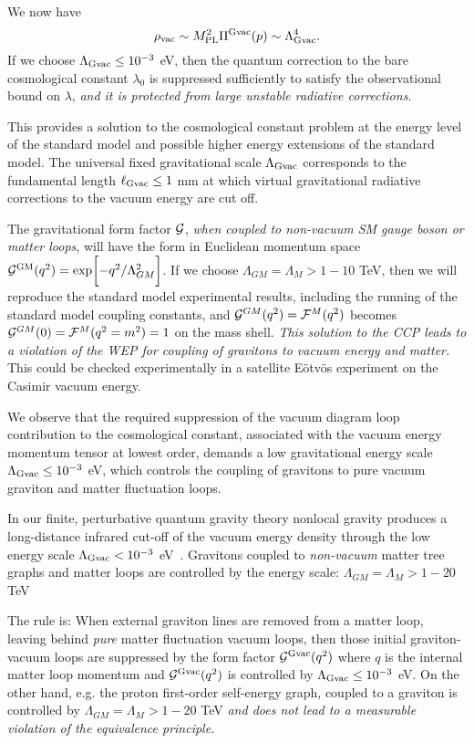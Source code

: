 \documentclass[a4paper,11pt]{article}
\begin{document}
We now have
\begin{equation}
\rho_{\rm vac}\sim M^2_{\rm PL}\Pi^{\rm {\rm Gvac}}(p)\sim\Lambda_{{\rm
Gvac}}^4.
\end{equation} If we choose $\Lambda_{{\rm Gvac}}\leq 10^{-3}$
eV, then the quantum correction to the bare cosmological constant
$\lambda_0$ is suppressed sufficiently to satisfy the observational bound
on $\lambda$, {\it and it is protected from large unstable radiative
corrections}.

This provides a solution to the
cosmological constant problem at the energy level of the standard model
and possible higher energy extensions of the standard model. The universal
fixed gravitational scale $\Lambda_{{\rm Gvac}}$ corresponds to the fundamental
length $\ell_{{\rm Gvac}}\leq 1$ mm at which virtual gravitational radiative
corrections to the vacuum energy are cut off.

The gravitational form factor ${\cal G}$, {\it when
coupled to non-vacuum SM gauge boson or matter loops}, will have the form
in Euclidean momentum space
${\cal G}^{\rm GM}(q^2)
=\exp\biggl[-q^2/\Lambda_{GM}^2\biggr]$.
If we choose $\Lambda_{GM} = \Lambda_{M}> 1-10$ TeV, then we will
reproduce the standard model experimental results, including the running
of the standard model coupling constants, and ${\cal G}^{GM}(q^2)={\cal
F}^M(q^2)$ becomes ${\cal G}^{GM}(0)={\cal F}^M(q^2=m^2)=1$ on the mass
shell. {\it This solution to the CCP leads to a violation of the WEP for
coupling of gravitons to vacuum energy and matter.} This
could be checked experimentally in a satellite E\"otv\"os experiment on the
Casimir vacuum energy.

We observe that the required suppression of the vacuum diagram
loop contribution to the cosmological constant, associated with
the vacuum energy momentum tensor at lowest order,
demands a low gravitational energy scale $\Lambda_{{\rm Gvac}}\leq
10^{-3}$ eV, which controls the coupling of gravitons to
pure vacuum graviton and matter fluctuation loops.

In our finite, perturbative
quantum gravity theory nonlocal gravity produces a long-distance
infrared cut-off of the vacuum energy density through the low energy
scale $\Lambda_{{\rm Gvac}} < 10^{-3}$ eV~\cite{Moffat2}.
Gravitons coupled to {\it non-vacuum} matter tree graphs and matter loops
are controlled by the energy scale: $\Lambda_{GM}=\Lambda_{M} > 1-20$
TeV

The rule is: When external graviton lines are removed from a
matter loop, leaving behind {\it pure} matter fluctuation vacuum loops,
then those initial graviton-vacuum loops are suppressed by the form factor
${\cal G}^{{\rm Gvac}}(q^2)$ where $q$ is the internal matter loop momentum and
${\cal G}^{{\rm Gvac}}(q^2)$ is controlled by $\Lambda_{{\rm Gvac}} \leq 10^{-3}$ eV.
On the other hand, e.g. the proton first-order self-energy graph, coupled
to a graviton is controlled by $\Lambda_{GM}=\Lambda_M > 1-20$ TeV {\it
and does not lead to a measurable violation of the equivalence principle.}
\end{document}
